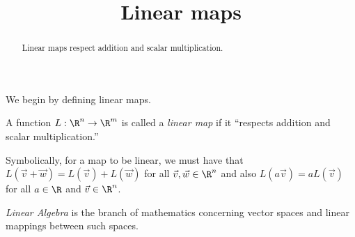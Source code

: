 \documentclass{ximera}
\title{Linear maps}
\begin{document}
\begin{abstract}
  Linear maps respect addition and scalar multiplication.
\end{abstract}
\maketitle

We begin by defining linear maps.

\begin{definition}
  A function $L: \R^n \to \R^m$ is called a \textit{linear map} if it
  ``respects addition and scalar multiplication.''

  Symbolically, for a map to be linear, we must have that
  $L(\vec{v}+\vec{w}) = L(\vec{v})+L(\vec{w})$ for all
  $\vec{v},\vec{w} \in \R^n$ and also $L(a\vec{v}) = a L(\vec{v})$ for
  all $a \in \R$ and $\vec{v}\in \R^n$.
\end{definition}


\begin{definition}
	\textit{Linear Algebra} is the branch of mathematics concerning vector spaces and linear mappings between such spaces.
\end{definition}
\end{document}
